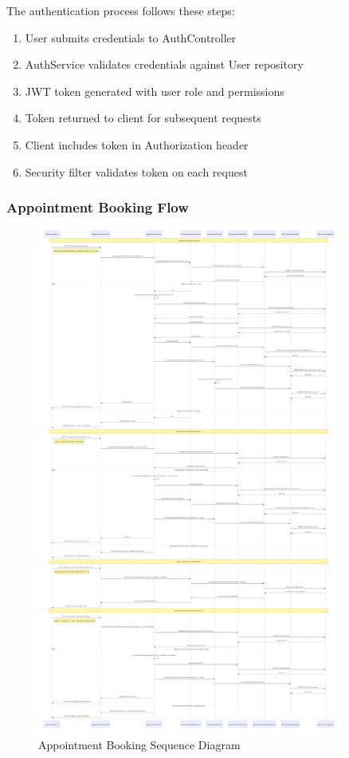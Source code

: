 \documentclass[12pt,a4paper]{article}
\begin{document}
The authentication process follows these steps:
\begin{enumerate}
    \item User submits credentials to AuthController
    \item AuthService validates credentials against User repository
    \item JWT token generated with user role and permissions
    \item Token returned to client for subsequent requests
    \item Client includes token in Authorization header
    \item Security filter validates token on each request
\end{enumerate}

\subsubsection{Appointment Booking Flow}
\begin{figure}[H]
\centering
\includegraphics[width=0.9\textwidth]{diagrams/appointment_booking_sequence}
\caption{Appointment Booking Sequence Diagram}
\label{fig:appointment-sequence}
\end{figure}
\end{document}
